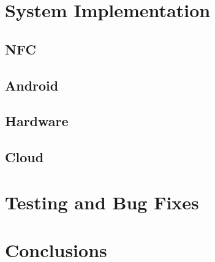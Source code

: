 \documentclass[12pt]{report}
\begin{document}

\chapter{System Implementation}


\section{NFC}


\section{Android}


\section{Hardware}


\section{Cloud}


\chapter{Testing and Bug Fixes}



\chapter{Conclusions}

\end{document}
